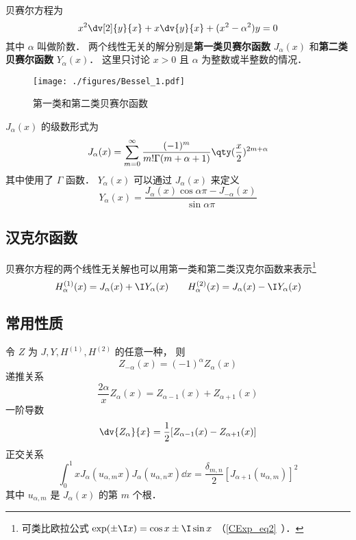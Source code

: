 
贝赛尔方程为%
\begin{equation}
x^2 \dv[2]{y}{x} + x\dv{y}{x} + (x^2 - \alpha ^2)y = 0
\end{equation}
其中 $\alpha$ 叫做阶数． 两个线性无关的解分别是\textbf{第一类贝赛尔函数} $J_\alpha(x)$ 和\textbf{第二类贝赛尔函数} $Y_\alpha(x)$． 这里只讨论 $x > 0$ 且 $\alpha$ 为整数或半整数的情况．

\begin{figure}[ht]
\centering
\texttt{[image: ./figures/Bessel\_1.pdf]}
\caption{第一类和第二类贝赛尔函数} \label{Bessel_fig1}
\end{figure}

$J_\alpha(x)$ 的级数形式为
\begin{equation}
J_\alpha(x) = \sum_{m=0}^\infty \frac{(-1)^m}{m!\Gamma(m+\alpha+1)} \qty(\frac x2)^{2m+\alpha}
\end{equation}
其中使用了 $\Gamma$ 函数． $Y_\alpha(x)$ 可以通过 $J_\alpha(x)$ 来定义
\begin{equation}
Y_\alpha(x) = \frac{J_\alpha(x)\cos\alpha\pi - J_{-\alpha}(x)}{\sin\alpha\pi}
\end{equation}

\subsection{汉克尔函数}
贝赛尔方程的两个线性无关解也可以用第一类和第二类汉克尔函数来表示\footnote{可类比欧拉公式 $\exp(\pm\I x) = \cos x \pm \I\sin x$ （\autoref{CExp_eq2}~）．}
\begin{equation}
H_\alpha ^{(1)}(x) = J_\alpha(x) + \I Y_\alpha(x)
\qquad
H_\alpha ^{(2)}(x) = J_\alpha(x) - \I Y_\alpha(x)
\end{equation}

\subsection{常用性质}
令 $Z$ 为 $J, Y, H^{(1)}, H^{(2)}$ 的任意一种， 则
\begin{equation}
Z_{-\alpha}(x) = (-1)^\alpha Z_\alpha(x)
\end{equation}
递推关系
\begin{equation}
\frac{2\alpha}{x} Z_\alpha(x) = Z_{\alpha -1}(x) + Z_{\alpha+1}(x)
\end{equation}
一阶导数
\begin{equation}
\dv{Z_\alpha}{x} = \frac12 [Z_{\alpha  - 1}(x) - Z_{\alpha +1}(x)]
\end{equation}
正交关系
\begin{equation}
\int_0^1 x J_\alpha (u_{\alpha ,m} x) J_\alpha (u_{\alpha ,n} x) \dd{x} = \frac{\delta_{m,n}}{2}[J_{\alpha + 1} (u_{\alpha ,m})]^2
\end{equation}
其中 $u_{\alpha, m}$ 是 $J_\alpha(x)$ 的第 $m$ 个根．

